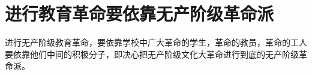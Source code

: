 \section[进行教育革命要依靠无产阶级革命派（一九六七年十月二十五日）]{进行教育革命要依靠无产阶级革命派}


进行无产阶级教育革命，要依靠学校中广大革命的学生，革命的教员，革命的工人要依靠他们中间的积极分子，即决心把无产阶级文化大革命进行到底的无产阶级革命派。


